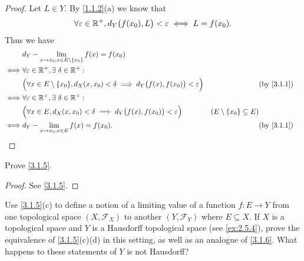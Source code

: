 \begin{proof}
  Let \(L \in Y\).
  By \cref{1.1.2}(a) we know that
  \[
    \forall \varepsilon \in \mathbb{R}^+, d_Y\big(f(x_0), L\big) < \varepsilon \iff L = f(x_0).
  \]
  Thus we have
  \begin{align*}
         & d_Y - \lim_{x \to x_0 ; x \in E \setminus \{x_0\}} f(x) = f(x_0)                                                                                                    \\
    \iff & \forall \varepsilon \in \R^+, \exists\ \delta \in \R^+ :                                                                                                            \\
         & \Big(\forall x \in E \setminus \{x_0\}, d_X(x, x_0) < \delta \implies d_Y\big(f(x), f(x_0)\big) < \varepsilon\Big) &                                   & \by{3.1.1} \\
    \iff & \forall \varepsilon \in \R^+, \exists\ \delta \in \R^+ :                                                                                                            \\
         & \Big(\forall x \in E, d_X(x, x_0) < \delta \implies d_Y\big(f(x), f(x_0)\big) < \varepsilon\Big)                   & (E \setminus \{x_0\} \subseteq E)              \\
    \iff & d_Y - \lim_{x \to x_0 ; x \in E} f(x) = f(x_0).                                                                    &                                   & \by{3.1.1}
  \end{align*}
\end{proof}

\begin{ex}\label{ex:3.1.2}
  Prove \cref{3.1.5}.
\end{ex}

\begin{proof}
  See \cref{3.1.5}.
\end{proof}

\begin{ex}\label{ex:3.1.3}
  Use \cref{3.1.5}(c) to define a notion of a limiting value of a function \(f : E \to Y\) from one topological space \((X, \mathcal{F}_X)\) to another \((Y, \mathcal{F}_Y)\) where \(E \subseteq X\).
  If \(X\) is a topological space and \(Y\) is a Hausdorff topological space (see \cref{ex:2.5.4}), prove the equivalence of \cref{3.1.5}(c)(d) in this setting, as well as an analogue of \cref{3.1.6}.
  What happens to these statements of \(Y\) is not Hausdorff?
\end{ex}

